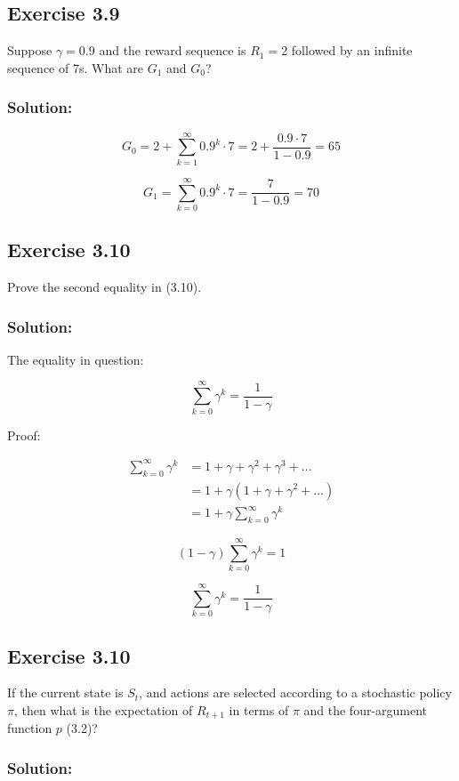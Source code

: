 \subsection*{Exercise 3.9}
Suppose  $\gamma = 0.9$ and the reward sequence is $R_1 = 2$ followed by an infinite
sequence of 7s. What are $G_1$ and $G_0$? 

\subsubsection*{Solution:}

\[
G_0 = 2 + \sum_{k = 1}^{\infty} 0.9^k \cdot 7  = 2 + \frac{0.9 \cdot 7}{1-0.9} = 65
\]

\[
G_1 = \sum_{k = 0}^{\infty} 0.9^k \cdot 7 = \frac{7}{1-0.9} = 70
\]

\subsection*{Exercise 3.10}
Prove the second equality in (3.10).

\subsubsection*{Solution:}

The equality in question:

\[
\sum_{k = 0}^{\infty} \gamma^k = \frac{1}{1-\gamma}
\]

Proof:

\begin{align*}
    \sum_{k = 0}^{\infty} \gamma^k &= 1 + \gamma + \gamma^2 + \gamma^3 + \dots \\
    &= 1 + \gamma (1 + \gamma + \gamma^2  + \dots) \\
    &= 1 + \gamma \sum_{k = 0}^{\infty} \gamma^k
\end{align*}

\[
(1 - \gamma)\sum_{k = 0}^{\infty} \gamma^k = 1
\]

\[
\sum_{k = 0}^{\infty} \gamma^k = \frac{1}{1 - \gamma}
\]

\subsection*{Exercise 3.10}
If the current state is $S_t$, and actions are selected according to a stochastic
policy $\pi$, then what is the expectation of $R_{t+1}$ in terms of $\pi$ and the four-argument
function $p$ (3.2)?

\subsubsection*{Solution:}

